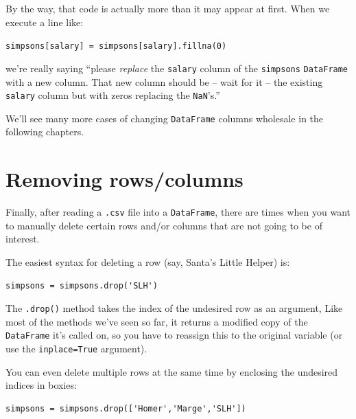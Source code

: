 \begin{samepage}
By the way, that code is actually more than it may appear at first. When we
execute a line like:

\vspace{-.1in}
\begin{center}
\texttt{simpsons[\textquotesingle salary\textquotesingle] =
simpsons[\textquotesingle salary\textquotesingle].fillna(0)}
\end{center}
\vspace{-.1in}
\end{samepage}

we're really saying ``please \textit{replace} the \texttt{salary} column of the
\texttt{simpsons} \texttt{DataFrame} with a new column. That new column should
be -- wait for it -- the existing \texttt{salary} column but with zeros
replacing the \texttt{NaN}'s.''

We'll see many more cases of changing \texttt{DataFrame} columns wholesale in
the following chapters.

\section{Removing rows/columns}

Finally, after reading a \texttt{.csv} file into a \texttt{DataFrame}, there
are times when you want to manually delete certain rows and/or columns that are
not going to be of interest.


\begin{samepage}

The easiest syntax for deleting a row (say, Santa's Little Helper) is:

\begin{Verbatim}[fontsize=\small,samepage=true,frame=single,framesep=3mm]
simpsons = simpsons.drop('SLH')
\end{Verbatim}
\end{samepage}

The \texttt{.drop()} method takes the index of the undesired row as an
argument, Like most of the methods we've seen so far, it returns a modified
copy of the \texttt{DataFrame} it's called on, so you have to reassign this to
the original variable (or use the \texttt{inplace=True} argument).


\begin{samepage}
You can even delete multiple rows at the same time by enclosing the undesired
indices in boxies:

\begin{Verbatim}[fontsize=\small,samepage=true,frame=single,framesep=3mm]
simpsons = simpsons.drop(['Homer','Marge','SLH'])
\end{Verbatim}
\end{samepage}

